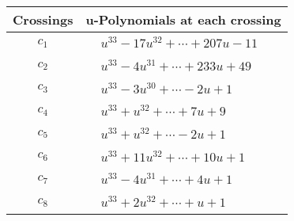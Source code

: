 \documentclass[1p]{elsarticle_modified}
\theoremstyle{definition}
\begin{document}
\begin{tabular}{m{50pt}|m{274pt}}
Crossings & \hspace{64pt}u-Polynomials at each crossing \\
\hline $$\begin{aligned}c_{1}\end{aligned}$$&$\begin{aligned}
&u^{33}-17 u^{32}+\cdots+207 u-11
\end{aligned}$\\
\hline $$\begin{aligned}c_{2}\end{aligned}$$&$\begin{aligned}
&u^{33}-4 u^{31}+\cdots+233 u+49
\end{aligned}$\\
\hline $$\begin{aligned}c_{3}\end{aligned}$$&$\begin{aligned}
&u^{33}-3 u^{30}+\cdots-2 u+1
\end{aligned}$\\
\hline $$\begin{aligned}c_{4}\end{aligned}$$&$\begin{aligned}
&u^{33}+u^{32}+\cdots+7 u+9
\end{aligned}$\\
\hline $$\begin{aligned}c_{5}\end{aligned}$$&$\begin{aligned}
&u^{33}+u^{32}+\cdots-2 u+1
\end{aligned}$\\
\hline $$\begin{aligned}c_{6}\end{aligned}$$&$\begin{aligned}
&u^{33}+11 u^{32}+\cdots+10 u+1
\end{aligned}$\\
\hline $$\begin{aligned}c_{7}\end{aligned}$$&$\begin{aligned}
&u^{33}-4 u^{31}+\cdots+4 u+1
\end{aligned}$\\
\hline $$\begin{aligned}c_{8}\end{aligned}$$&$\begin{aligned}
&u^{33}+2 u^{32}+\cdots+u+1
\end{aligned}$\\

\end{tabular}
\end{document}
